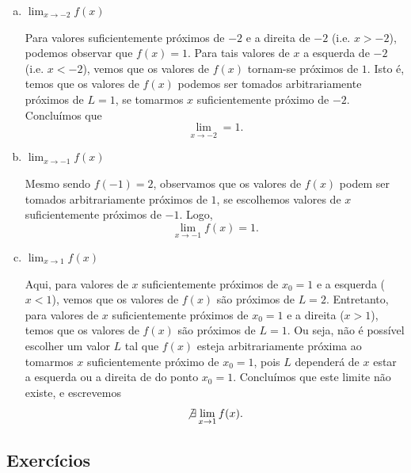 \begin{resol}
  \begin{enumerate}[a)]
  \item $\displaystyle \lim_{x\to -2} f(x)$

    Para valores suficientemente próximos de $-2$ e a direita de $-2$ (i.e. $x>-2$), podemos observar que $f(x)=1$. Para tais valores de $x$ a esquerda de $-2$ (i.e. $x<-2$), vemos que os valores de $f(x)$ tornam-se próximos de $1$. Isto é, temos que os valores de $f(x)$ podemos ser tomados arbitrariamente próximos de $L=1$, se tomarmos $x$ suficientemente próximo de $-2$. Concluímos que
    \begin{equation}
      \lim_{x\to -2} = 1.
    \end{equation}

  \item $\displaystyle \lim_{x\to -1} f(x)$

    Mesmo sendo $f(-1)=2$, observamos que os valores de $f(x)$ podem ser tomados arbitrariamente próximos de $1$, se escolhemos valores de $x$ suficientemente próximos de $-1$. Logo,
    \begin{equation}
      \lim_{x\to -1} f(x) = 1.
    \end{equation}

    \item $\displaystyle \lim_{x\to 1} f(x)$

      Aqui, para valores de $x$ suficientemente próximos de $x_0=1$ e a esquerda ($x<1$), vemos que os valores de $f(x)$ são próximos de $L=2$. Entretanto, para valores de $x$ suficientemente próximos de $x_0=1$ e a direita ($x>1$), temos que os valores de $f(x)$ são próximos de $L=1$. Ou seja, não é possível escolher um valor $L$ tal que $f(x)$ esteja arbitrariamente próxima ao tomarmos $x$ suficientemente próximo de $x_0=1$, pois $L$ dependerá de $x$ estar a esquerda ou a direita de do ponto $x_0 = 1$. Concluímos que este limite não existe, e escrevemos
      \begin{equation}
        \not\exists\lim_{x\to 1} f(x).
      \end{equation}
  \end{enumerate}
\end{resol}

\subsection{Exercícios}


